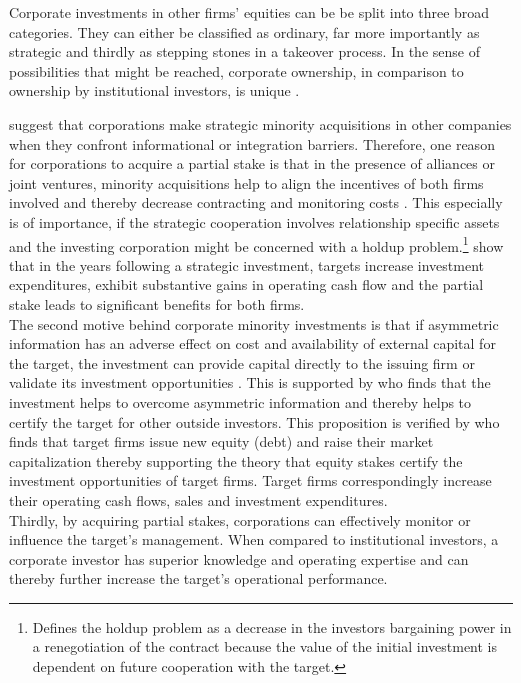 \documentclass[12pt]{article}
\begin{document}
Corporate investments in other firms' equities can be be split into three broad categories. They can either be classified as ordinary, far more importantly as strategic and thirdly as stepping stones in a takeover process. 
In the sense of possibilities that might be reached, corporate ownership, in comparison to ownership by institutional investors, is unique \citep[p.2791]{Allen2000}.

\citet[p.1]{Huang2017} suggest that corporations make strategic minority acquisitions in other companies when they confront informational or integration barriers. 
Therefore, one reason for corporations to acquire a partial stake is that in the presence of alliances or joint ventures, minority acquisitions help to align the incentives of both firms involved and thereby decrease contracting and monitoring costs \citep[p.2792]{Allen2000}. This especially is of importance, if the strategic cooperation involves relationship specific assets and the investing corporation might be concerned with a holdup problem.\footnote{\citet[p.1023]{Ouimet2013} Defines the holdup problem as a decrease in the investors bargaining power in a renegotiation of the contract because the value of the initial investment is dependent on future cooperation with the target.} \citet[p. 2793]{Allen2000} show that in the years following a strategic investment,  targets increase investment expenditures, exhibit substantive gains in operating cash flow and the partial stake leads to significant benefits for both firms.\\
The second motive behind corporate minority investments is that if asymmetric information has an adverse effect on cost and availability of external capital for the target, the investment can provide capital directly to the issuing firm or validate its investment opportunities \citep[p. 2792]{Allen2000}. This is supported by \citet[p.1038]{Ouimet2013} who finds that the investment helps to overcome asymmetric information and thereby helps to certify the target for other outside investors. This proposition is verified by \citet[p.78]{Liao2014} who finds that target firms issue new equity (debt) and raise their market capitalization thereby supporting the theory that equity stakes certify the investment opportunities of target firms. Target firms correspondingly increase their operating cash flows, sales and investment expenditures.\\ 
Thirdly, by acquiring partial stakes, corporations can effectively monitor or influence the target's management. When compared to institutional investors, a corporate investor has superior knowledge and operating expertise \citep[p.2792]{Allen2000} and can thereby further increase the target's operational performance.\\
\end{document}
